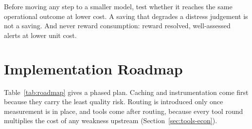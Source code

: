 \documentclass[conference]{IEEEtran}
\begin{document}
Before moving any step to a smaller model, test whether it reaches the same operational outcome at lower cost. A saving that degrades a distress judgement is not a saving. And never reward consumption: reward resolved, well-assessed alerts at lower unit cost.

\section{Implementation Roadmap}
\label{sec:roadmap}

Table~\ref{tab:roadmap} gives a phased plan. Caching and instrumentation come first because they carry the least quality risk. Routing is introduced only once measurement is in place, and tools come after routing, because every tool round multiplies the cost of any weakness upstream (Section~\ref{sec:tools-econ}).
\end{document}
